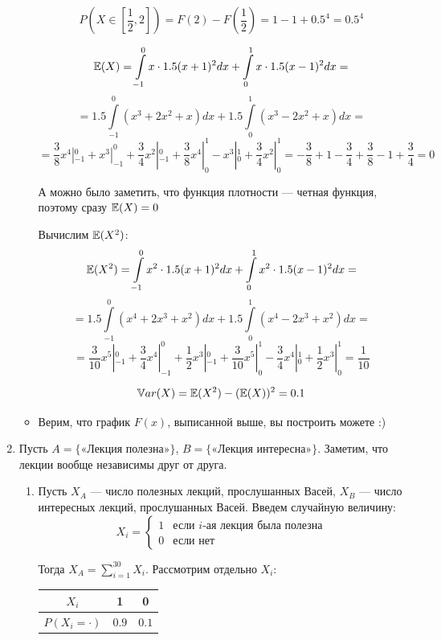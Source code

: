 \documentclass[12pt, a4paper]{article}\usepackage[]{graphicx}\usepackage[]{color}
\begin{document}
\begin{enumerate}
\begin{itemize}
\[P\left(X \in \left[\dfrac{1}{2}, 2 \right]  \right) = F(2) - F\left(\dfrac{1}{2} \right) = 1 - 1 +0.5^4 = 0.5^4 \]

\[\mathbb{E}(X) = \int \limits_{-1}^0 x \cdot 1.5 (x + 1)^2 dx +  \int \limits_0^1 x \cdot 1.5 (x - 1)^2 dx = \]
\[= 1.5 \int \limits_{-1}^0\left( x^3 + 2x^2 + x\right) dx + 1.5 \int \limits_0^1\left( x^3 -2x^2 + x\right) dx = \]
\[=  \dfrac{3}{8} x^4 |_{-1}^0 + x^3 |_{-1}^0 + \dfrac{3}{4} x^2|_{-1}^0+    \dfrac{3}{8} x^4 |_0^1   - x^3 |_0^1 + \dfrac{3}{4} x^2|_0^1  = - \dfrac{3}{8}  + 1- \dfrac{3}{4} + \dfrac{3}{8} - 1 +\dfrac{3}{4} = 0 \]

А можно было заметить, что функция плотности — четная функция, поэтому сразу $\mathbb{E}(X) = 0$

Вычислим $\mathbb{E}(X^2)$:
\[\mathbb{E}(X^2) = \int \limits_{-1}^0 x^2 \cdot 1.5 (x + 1)^2 dx +  \int \limits_0^1 x^2 \cdot 1.5 (x - 1)^2 dx = \]
\[= 1.5 \int \limits_{-1}^0\left( x^4 + 2x^3 + x^2\right) dx + 1.5 \int \limits_0^1\left( x^4 -2x^3 + x^2\right) dx = \]
\[=  \dfrac{3}{10} x^5 |_{-1}^0 + \dfrac{3}{4} x^4|_{-1}^0 + \dfrac{1}{2} x^3 |_{-1}^0 +  \dfrac{3}{10} x^5 |_0^1 - \dfrac{3}{4} x^4|_0^1  + \dfrac{1}{2} x^3 |_0^1 =  \dfrac{1}{10}\]

\[\mathbb{V}ar(X) = \mathbb{E}(X^2) - (\mathbb{E}(X))^2 = 0.1\]

\item Верим, что график $F(x)$, выписанной выше, вы построить можете :)
\end{itemize}
\item
Пусть $A = \{\text{«Лекция полезна»}\}$, $B = \{\text{«Лекция интересна»}\}$. Заметим, что лекции вообще независимы друг от друга.

\begin{enumerate}
\item Пусть $X_A$ — число полезных лекций, прослушанных Васей,  $X_B$ — число интересных лекций, прослушанных Васей. Введем случайную величину:
\[X_i =
\begin{cases}
1 & \text{если } i\text{-ая лекция была полезна}\\
0 & \text{если нет}
\end{cases}
\]

Тогда $X_A = \sum\limits_{i=1}^{30}X_i$. Рассмотрим отдельно $X_i$: \hspace{0.5cm}
\begin{minipage}{0.3\linewidth}

\begin{tabular}{c|c|c}
$X_i$ & 1 & 0 \\
\hline
$P(X_i = \cdot)$ & $0.9$ & $0.1$
\end{tabular}
\end{minipage}


\end{enumerate}
\end{enumerate}
\end{document}
